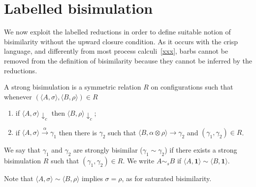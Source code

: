 \documentclass{llncs}
\def\monid{{\mathbf 0}}
\def\monid{\mathbf{1}}
\begin{document}
\section{Labelled bisimulation}
We now exploit the labelled reductions in order to define suitable notion of bisimilarity without the upward closure condition.
As it occurs with the crisp language, and differently from most process calculi~\ref{xxx}, barbs cannot be removed from the 
definition of bisimilarity because they cannot be inferred by the reductions.

\begin{definition}\label{def:strongbis} A strong bisimulation is a symmetric relation $R$ on configurations such that whenever
$( \langle A, \sigma \rangle,\langle B, \rho \rangle) \in R$
\begin{enumerate}
\item if $\langle A, \sigma \rangle \downarrow_c$ then $\langle B, \rho \rangle \downarrow_c$;
\item if $\langle A, \sigma \rangle \xrightarrow{\alpha} \gamma_1$ then there is $\gamma_2$ such that $\langle B, \alpha \otimes \rho \rangle \to \gamma_2$ 
and $(\gamma_1, \gamma_2) \in R$.
\end{enumerate}
We say that $\gamma_1$ and $\gamma_2$ are  strongly bisimilar ($\gamma_1  \sim \gamma_2$) if there exists a strong  bisimulation 
$R$ such that $(\gamma_1 , \gamma_2 ) \in R$. We write $A \sim_{\mathit{s}} B$ if $\langle A, \monid \rangle \sim \langle B, \monid \rangle$.
\end{definition}

Note that $\langle A, \sigma \rangle \sim \langle B, \rho \rangle$ implies
$\sigma = \rho$, as for saturated bisimilarity.
\end{document}
